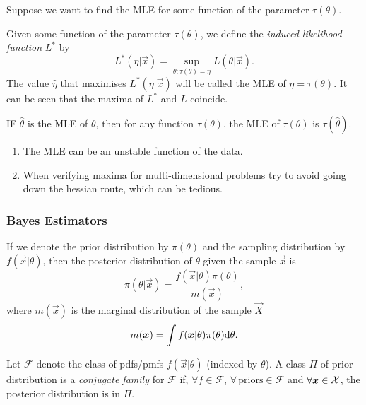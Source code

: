 Suppose we want to find the MLE for some function of the parameter $\tau(\theta)$.

\begin{definition}
    Given some function of the parameter $\tau(\theta)$, we define the \emph{induced likelihood function} $L^*$ by
    \[
        L^*(\eta \vert{} \vec{x}) = \sup_{\theta : \tau(\theta) = \eta} L(\theta \vert{} \vec{x}).
    \]
    The value $\hat{\eta}$ that maximises $L^*(\eta \vert{} \vec{x})$ will be called the MLE of $\eta = \tau(\theta)$. It can be seen that the maxima of $L^*$ and $L$ coincide.
\end{definition}

\begin{theorem}
    IF $\hat{\theta}$ is the MLE of $\theta$, then for any function $\tau(\theta)$, the MLE of $\tau(\theta)$ is $\tau(\hat{\theta})$.
\end{theorem}

\begin{remark}
    \mbox{}
    \begin{enumerate}[1)]
        \item The MLE can be an unstable function of the data.
        \item When verifying maxima for multi-dimensional problems try to avoid going down the hessian route, which can be tedious.
    \end{enumerate}
\end{remark}

\subsubsection{Bayes Estimators}
If we denote the prior distribution by $\pi(\theta)$ and the sampling distribution by $f(\vec{x} \vert{} \theta)$, then the posterior distribution of $\theta$ given the sample $\vec{x}$ is
    \[
        \pi(\theta \vert{} \vec{x}) = \frac{f(\vec{x}\vert{}\theta)\pi(\theta)}{m(\vec{x})},
    \]
    where $m(\vec{x})$ is the marginal distribution of the sample $\vec{X}$
    \[
        m(\bm{x}) = \int f(\bm{x}\vert{}\theta) \pi(\theta) \text{d}{}\theta.
    \]
    
\begin{definition}
    Let $\mathcal{F}$ denote the class of pdfs/pmfs $f(\vec{x} \vert{} \theta)$ (indexed by $\theta$). A class $\Pi$ of prior distribution is a \emph{conjugate family} for $\mathcal{F}$ if, $\forall f \in \mathcal{F}$, $\forall \, \text{priors} \in \mathcal{F}$ and $\forall \bm{x} \in \mathcal{X}{}$, the posterior distribution is in $\Pi$.
\end{definition}

